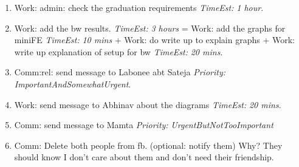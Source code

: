 \documentclass[11pt]{article}
\newcommand{\te}[1]{\textit{TimeEst:} \textit{#1}}
\newcommand{\priority}[1]{\textit{Priority:} \textit{#1}}
\begin{document}
\begin{enumerate}
\item Work: admin: check the graduation requirements \te{1 hour}.

\item Work: add the bw results. \te{3 hours}  =  Work: add the graphs
  for miniFE \te{10 mins}   +  Work: do write up to explain graphs +
  Work: write up explanation of setup for bw  \te{20 mins}. 

\item Comm:rel: send message to Labonee abt Sateja
  \priority{ImportantAndSomewhatUrgent}. 

\item Work: send message to Abhinav about the diagrams \te{20 mins}. 

\item Comm: send message to Mamta  \priority{UrgentButNotTooImportant} 

\item Comm: Delete both people from fb. (optional: notify them) Why?
 They should know I don't care about them and don't need their friendship. 

\end{enumerate}
 
\newpage
\end{document}
